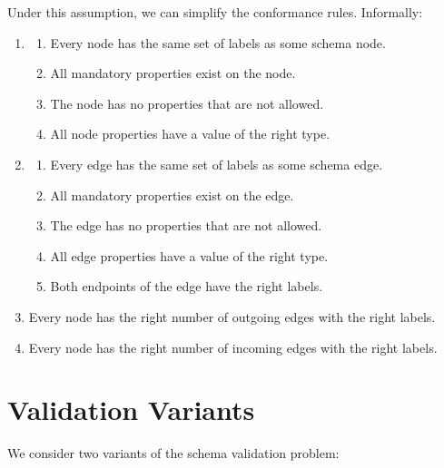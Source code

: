 \documentclass{report}
\theoremstyle{definition}
\begin{document}
Under this assumption, we can simplify the conformance rules. Informally:

\begin{enumerate}
  \item
        \begin{enumerate}
          \item\label{rule:simp-node-labels}
          Every node has the same set of labels as some schema node.
          \item\label{rule:simp-node-mandatory-props}
          All mandatory properties exist on the node.
          \item\label{rule:simp-node-allowed-props}
          The node has no properties that are not allowed.
          \item\label{rule:simp-node-datatype}
          All node properties have a value of the right type.
        \end{enumerate}
  \item
        \begin{enumerate}
          \item\label{rule:simp-edge-labels}
          Every edge has the same set of labels as some schema edge.
          \item\label{rule:simp-edge-mandatory-props}
          All mandatory properties exist on the edge.
          \item\label{rule:simp-edge-allowed-props}
          The edge has no properties that are not allowed.
          \item\label{rule:simp-edge-datatype}
          All edge properties have a value of the right type.
          \item\label{rule:simp-edge-endpoints}
          Both endpoints of the edge have the right labels.
        \end{enumerate}
        \item\label{rule:simp-card-out}
        Every node has the right number of outgoing edges with the right labels.
        \item\label{rule:simp-card-in}
        Every node has the right number of incoming edges with the right labels.
\end{enumerate}

\section{Validation Variants}
\label{sec:variants}

We consider two variants of the schema validation problem:
\end{document}
